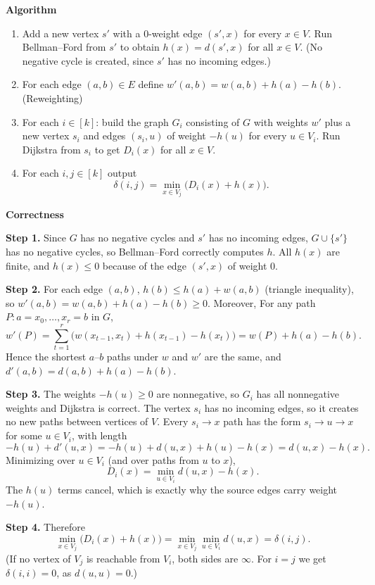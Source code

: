 \documentclass[11pt]{article}
\begin{document}
\medskip

\textbf{Algorithm}
\begin{enumerate}
  \item Add a new vertex $s'$ with a $0$-weight edge $(s',x)$ for every $x\in V$. Run Bellman--Ford from $s'$ to obtain $h(x)=d(s',x)$ for all $x \in V$. (No negative cycle is created, since $s'$ has no incoming edges.)
  \item  For each edge $(a,b)\in E$ define $w'(a,b)=w(a,b)+h(a)-h(b)$. (Reweighting)
  \item For each $i\in[k]$: build the graph $G_i$ consisting of $G$ with weights $w'$ plus a new vertex $s_i$ and edges $(s_i,u)$ of weight $-h(u)$ for every $u\in V_i$. Run Dijkstra from $s_i$ to get $D_i(x)$ for all $x\in V$.
  \item For each $i,j\in[k]$ output
  \[
    \delta(i,j)=\min_{x\in V_j}\bigl(D_i(x)+h(x)\bigr).
  \]
\end{enumerate}

\medskip

\textbf{Correctness}

\textbf{Step 1.} Since $G$ has no negative cycles and $s'$ has no incoming edges, $G\cup\{s'\}$ has no negative cycles, so Bellman--Ford correctly computes $h$. All $h(x)$ are finite, and $h(x)\le 0$ because of the edge $(s',x)$ of weight $0$.

\textbf{Step 2.} For each edge $(a,b)$, $h(b)\le h(a)+w(a,b)$ (triangle inequality), so $w'(a,b)=w(a,b)+h(a)-h(b)\ge 0$. Moreover, For any path $P: a=x_0,\dots,x_r=b$ in $G$,
\[
w'(P)=\sum_{t=1}^{r}\bigl(w(x_{t-1},x_t)+h(x_{t-1})-h(x_t)\bigr)=w(P)+h(a)-h(b).
\]
Hence the shortest $a$--$b$ paths under $w$ and $w'$ are the same, and $d'(a,b)=d(a,b)+h(a)-h(b)$.

\textbf{Step 3.} The weights $-h(u)\ge 0$ are nonnegative, so $G_i$ has all nonnegative weights and Dijkstra is correct. The vertex $s_i$ has no incoming edges, so it creates no new paths between vertices of $V$. Every $s_i\to x$ path has the form $s_i\to u\to x$ for some $u\in V_i$, with length
\[
-h(u)+d'(u,x)=-h(u)+d(u,x)+h(u)-h(x)=d(u,x)-h(x).
\]
Minimizing over $u\in V_i$ (and over paths from $u$ to $x$),
\[
D_i(x)=\min_{u\in V_i} d(u,x)-h(x).
\]
The $h(u)$ terms cancel, which is exactly why the source edges carry weight $-h(u)$.

\textbf{Step 4.} Therefore
\[
\min_{x\in V_j}\bigl(D_i(x)+h(x)\bigr)=\min_{x\in V_j}\min_{u\in V_i}d(u,x)=\delta(i,j).
\]
(If no vertex of $V_j$ is reachable from $V_i$, both sides are $\infty$. For $i=j$ we get $\delta(i,i)=0$, as $d(u,u)=0$.)
\end{document}
